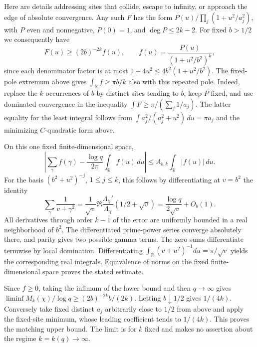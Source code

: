 Here are details addressing sites that collide, escape to infinity, or
approach the edge of absolute convergence. Any such $F$ has the form
$P(u)/\prod_j(1+u^2/a_j^2)$, with $P$ even and nonnegative,
$P(0)=1$, and $\deg P\le 2k-2$. For fixed $b>1/2$ we consequently have
\[
 F(u)\ge(2b)^{-2k}f(u),\qquad
 f(u)=\frac{P(u)}{(1+u^2/b^2)^k},
\]
since each denominator factor is at most $1+4u^2\le
4b^2(1+u^2/b^2)$. The fixed-pole extremum above gives
$\int_{\mathbb R} f\ge\pi b/k$ also with this repeated pole. Indeed,
replace the $k$ occurrences of $b$ by distinct sites tending to $b$,
keep $P$ fixed, and use dominated convergence in the inequality
$\int F\ge\pi/(\sum_j1/a_j)$. The latter equality for the least
integral follows from
$\int a_j^2/(a_j^2+u^2)\,du=\pi a_j$
and the minimizing $C$-quadratic form above.

On this one fixed finite-dimensional space,
\[
 \left|\sum_\gamma f(\gamma)-
        \frac{\log q}{2\pi}\int_{\mathbb R} f(u)\,du\right|
      \le A_{b,k}\int_{\mathbb R}|f(u)|\,du .
\]
For the basis $(b^2+u^2)^{-j}$, $1\le j\le k$, this follows by
differentiating at $v=b^2$ the identity
\[
 \sum_\gamma\frac{1}{v+\gamma^2}
   =\frac{1}{\sqrt v}\Re\frac{\Lambda_\chi'}{\Lambda_\chi}
          (1/2+\sqrt v)
   =\frac{\log q}{2\sqrt v}+O_b(1).
\]
All derivatives through order $k-1$ of the error are uniformly bounded
in a real neighborhood of $b^2$. The differentiated prime-power series
converge absolutely there, and parity gives two possible gamma terms. The zero sums differentiate termwise
by local domination. Differentiating $\int_{\mathbb R}(v+u^2)^{-1}du
=\pi/\sqrt v$ yields the corresponding real integrals. Equivalence of
norms on the fixed finite-dimensional space proves the stated estimate.

Since $f\ge0$, taking the infimum of the lower bound and then $q\to\infty$
gives $\liminf M_k(\chi)/\log q\ge(2b)^{-2k}b/(2k)$.
Letting $b\downarrow1/2$ gives $1/(4k)$. Conversely take fixed distinct
$a_j$ arbitrarily close to $1/2$ from above and apply the fixed-site
minimum, whose leading coefficient tends to $1/(4k)$. This proves the
matching upper bound. The limit is for $k$ fixed and makes no assertion
about the regime $k=k(q)\to\infty$.
